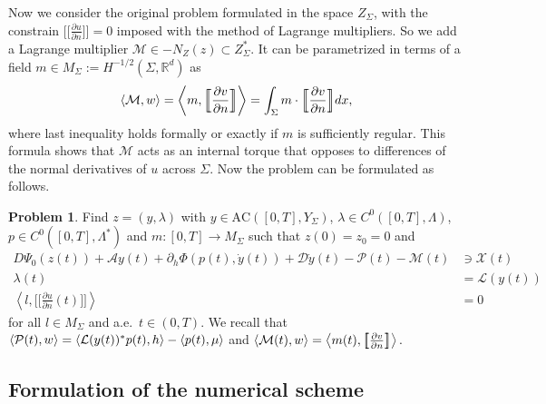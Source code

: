 \documentclass[a4paper,10pt,twoside]{amsbook}
\numberwithin{section}{chapter}
\numberwithin{equation}{chapter}
\theoremstyle{definition}
\newtheorem{prb}[prop]{Problem}
\DeclarePairedDelimiter{\dual}{\langle}{\rangle}
\newcommand{\dind}[2]{\frac{\partial #1}{\partial #2}}
\begin{document}
Now we consider the original problem formulated in the space $Z_\Sigma$, with the constrain $\big[\!\!\big[\dind{u}{n}\big]\!\!\big]=0$ imposed with the method of Lagrange multipliers. So we add a Lagrange multiplier $\mathcal{M}\in -N_Z(z)\subset Z^*_\Sigma$. It can be parametrized in terms of a field $m\in M_\Sigma:=H^{-1/2}(\Sigma,\mathbb{R}^d)$ as
\[
\dual{\mathcal{M},w}=\left\langle m,\Big[\!\!\Big[\dind{v}{n}\Big]\!\!\Big]\right\rangle=\int_\Sigma m\cdot\Big[\!\!\Big[\dind{v}{n}\Big]\!\!\Big]dx,
\]
where last inequality holds formally or exactly if $m$ is sufficiently regular. This formula shows that $\mathcal{M}$ acts as an internal torque that opposes to differences of the normal derivatives of $u$ across $\Sigma$. Now the problem can be formulated as follows.
\begin{prb}
\label{prb:reformulated}
Find $z=(y,\lambda)$ with $y\in\text{AC}([0,T],Y_\Sigma)$, $\lambda\in C^0([0,T],\Lambda)$, $p\in C^0([0,T],\Lambda^*)$ and $m\colon[0,T]\to M_\Sigma$ such that $z(0)=z_0=0$ and
\begin{align}
D\Psi_0(z(t))+\mathcal{A}y(t)+\partial_h\Phi(p(t),\dot y(t))+\mathcal{D}\dot y(t)-\mathcal{P}(t)-\mathcal{M}(t)&\ni\mathcal{X}(t) \\
\lambda(t)&=\mathcal{L}(y(t)) \\
\left\langle l,\Big[\!\!\Big[\dind{u}{n}(t)\Big]\!\!\Big]\right\rangle&=0
\end{align}
for all $l\in M_\Sigma$ and a.e.\ $t\in(0,T)$. We recall that $\dual{\mathcal{P}(t),w}=\dual{\mathcal{L}(y(t))^*p(t),h}-\dual{p(t),\mu}$ and $\dual{\mathcal{M}(t),w}=\left\langle m(t),\big[\!\!\big[\dind{v}{n}\big]\!\!\big]\right\rangle.$
\end{prb}

\subsection{Formulation of the numerical scheme}
\label{subsec:scheme}
\end{document}
